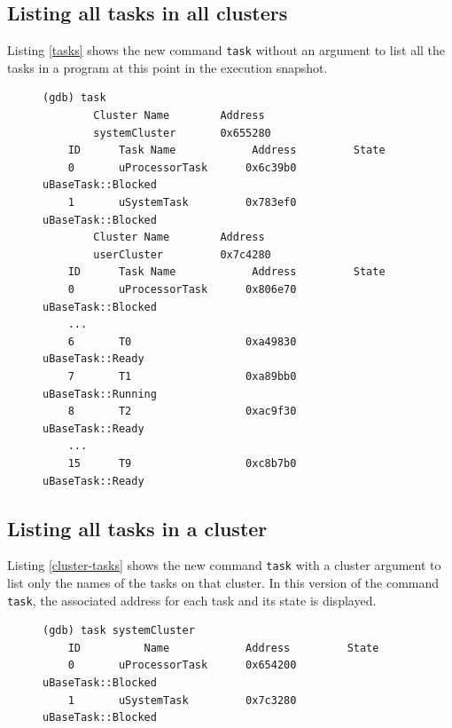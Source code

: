 \subsection{Listing all tasks in all clusters}
Listing \ref{tasks} shows the new command \verb|task| without an argument to
list all the tasks in a \uCPPS program at this point in the execution snapshot.
\begin{figure}
\begin{lstlisting}[caption={task command for displaying all tasks for all
clusters}, label={tasks}, basicstyle=\small\tt]
(gdb) task
        Cluster Name        Address
        systemCluster       0x655280
    ID      Task Name            Address         State
    0       uProcessorTask      0x6c39b0        uBaseTask::Blocked
    1       uSystemTask         0x783ef0        uBaseTask::Blocked
        Cluster Name        Address
        userCluster         0x7c4280
    ID      Task Name            Address         State
    0       uProcessorTask      0x806e70        uBaseTask::Blocked
    ...
    6       T0                  0xa49830        uBaseTask::Ready
    7       T1                  0xa89bb0        uBaseTask::Running
    8       T2                  0xac9f30        uBaseTask::Ready
    ...
    15      T9                  0xc8b7b0        uBaseTask::Ready
\end{lstlisting}
\end{figure}

\subsection{Listing all tasks in a cluster}
Listing \ref{cluster-tasks} shows the new command \verb|task| with a cluster
argument to list only the names of the tasks on that cluster.  In this version
of the command \verb|task|, the associated address for each task and its state
is displayed.
\begin{figure}
\begin{lstlisting}[caption={task command for displaying all tasks in a cluster}, label={cluster-tasks}, basicstyle=\small\tt]
(gdb) task systemCluster
    ID          Name            Address         State
    0       uProcessorTask      0x654200        uBaseTask::Blocked
    1       uSystemTask         0x7c3280        uBaseTask::Blocked
\end{lstlisting}
\end{figure}

